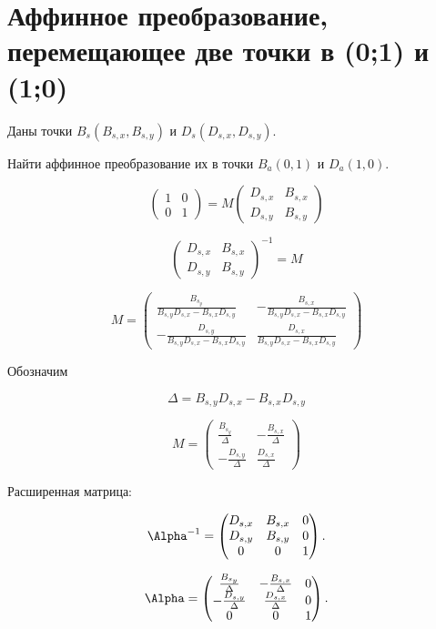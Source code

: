 \section{Аффинное преобразование, перемещающее две точки в (0;1) и (1;0)}

Даны точки $B_s(B_{s,x}, B_{s,y})$ и $D_s(D_{s,x}, D_{s,y})$.

Найти аффинное преобразование их в точки $B_a(0, 1)$ и $D_a(1, 0)$.

$$
\begin{pmatrix}
	1 & 0 \\
	0 & 1
\end{pmatrix}
= 
M
\begin{pmatrix}
	D_{s,x} & B_{s,x} \\
	D_{s,y} & B_{s,y}
\end{pmatrix}
$$

$$
\begin{pmatrix}
	D_{s,x} & B_{s,x} \\
	D_{s,y} & B_{s,y}
\end{pmatrix} ^ {-1}
= 
M
$$


$$
	M = 
	\begin{pmatrix}
		\frac{B_{s_y}}{B_{s,y} D_{s,x}-B_{s,x} D_{s,y}} & -\frac{B_{s,x}}{B_{s,y} D_{s,x}-B_{s,x} D_{s,y}}\\
		-\frac{D_{s,y}}{B_{s,y} D_{s,x}-B_{s,x} D_{s,y}} & \frac{D_{s,x}}{B_{s,y} D_{s,x}-B_{s,x} D_{s,y}}
	\end{pmatrix}
$$

Обозначим

$$ \Delta = B_{s,y} D_{s,x}-B_{s,x} D_{s,y}$$

$$
	M = 
	\begin{pmatrix}
		\frac{B_{s_y}}{\Delta} & -\frac{B_{s,x}}{\Delta}\\
		-\frac{D_{s,y}}{\Delta} & \frac{D_{s,x}}{\Delta}
	\end{pmatrix}
$$

Расширенная матрица:

$$ \Alpha^{-1} =
\begin{pmatrix}
	D_{s,x} & B_{s,x} & 0 \\
	D_{s,y} & B_{s,y} & 0 \\
	0 & 0 & 1
\end{pmatrix}.
$$

$$
	\Alpha = 
	\begin{pmatrix}
		\frac{B_{s_y}}{\Delta} & -\frac{B_{s,x}}{\Delta} & 0 \\
		-\frac{D_{s,y}}{\Delta} & \frac{D_{s,x}}{\Delta} & 0 \\
		0 & 0 & 1
	\end{pmatrix}.
$$
